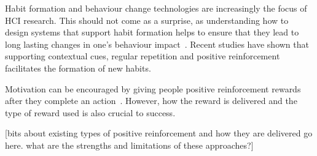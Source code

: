 \documentclass{scaffold/sigchi}
\begin{document}
Habit formation and behaviour change technologies are increasingly the focus of HCI research. This should not come as a surprise, as understanding how to design systems that support habit formation helps to ensure that they lead to long lasting changes in one's behaviour impact~\cite{how_to_evaluate_tech_for_behaviour_change}. Recent studies have shown that supporting contextual cues, regular repetition and positive reinforcement facilitates the formation of new habits. 



Motivation can be encouraged by giving people positive reinforcement rewards after they complete an action~\cite{positive_reinforcement_pro}. However, how the reward is delivered and the type of reward used is also crucial to success.

[bits about existing types of positive reinforcement and how they are delivered go here. what are the strengths and limitations of these approaches?]

\end{document}

